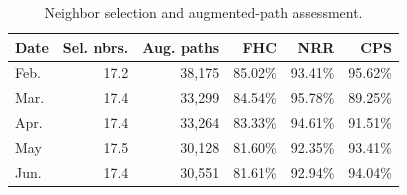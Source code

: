\begin{table}[t]
\centering
\caption{Neighbor selection and augmented-path assessment.}
\label{tab:stage_results}
\footnotesize
\renewcommand{\arraystretch}{1.12}
\begin{tabular*}{\columnwidth}{@{\extracolsep{\fill}}lrrrrr@{}}
\toprule
Date & Sel. nbrs. & Aug. paths & FHC & NRR & CPS\\
\midrule
Feb. & 17.2 & 38,175 & 85.02\% & 93.41\% & 95.62\%\\
Mar. & 17.4 & 33,299 & 84.54\% & 95.78\% & 89.25\%\\
Apr. & 17.4 & 33,264 & 83.33\% & 94.61\% & 91.51\%\\
May & 17.5 & 30,128 & 81.60\% & 92.35\% & 93.41\%\\
Jun. & 17.4 & 30,551 & 81.61\% & 92.94\% & 94.04\%\\
\bottomrule
\end{tabular*}
\end{table}

